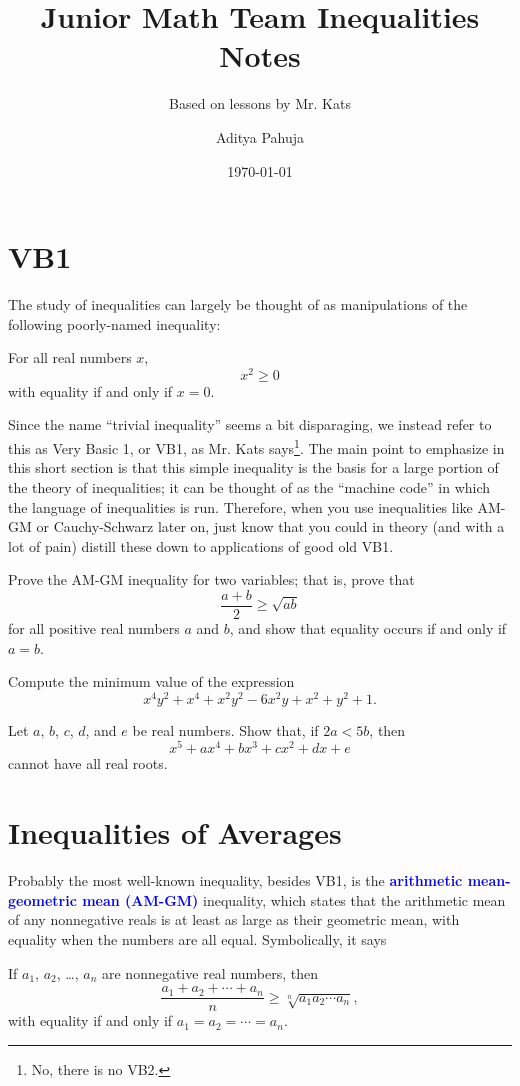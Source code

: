 \documentclass{scrartcl}
\title{Junior Math Team Inequalities Notes}
\subtitle{Based on lessons by Mr. Kats}
\author{Aditya Pahuja}
\date{\today}
\providecommand{\alert}[1]{{\sffamily\textbf{\textcolor{blue}{#1}}}}
\begin{document}
\maketitle
\tableofcontents
\pagebreak

\section{VB1}
The study of inequalities can largely be thought of as manipulations of
the following poorly-named inequality:
\begin{theorem}
	For all real numbers $x$,
	\[x^2 \ge 0\]
	with equality if and only if $x = 0$.
\end{theorem}

Since the name ``trivial inequality'' seems a bit disparaging,
we instead refer to this as Very Basic 1, or VB1, as Mr. Kats
says\footnote{No, there is no VB2.}.
The main point to emphasize in this short section is that
this simple inequality is the basis for a large portion of the
theory of inequalities; it can be thought of as the ``machine code'' in which
the language of inequalities is run.
Therefore, when you use inequalities like AM-GM or Cauchy-Schwarz later on,
just know that you could in theory (and with a lot of pain)
distill these down to applications of good old VB1.

\begin{problem}
	Prove the AM-GM inequality for two variables; that is, prove that
	\[\frac{a + b}{2}\ge \sqrt{ab}\]
	for all positive real numbers $a$ and $b$,
	and show that equality occurs if and only if $a = b$.
\end{problem}

\begin{problem}
	Compute the minimum value of the expression
	\[x^4y^2 + x^4 + x^2y^2 - 6x^2y + x^2 + y^2 + 1.\]
\end{problem}

\begin{problem}
	Let $a$, $b$, $c$, $d$, and $e$ be real numbers. Show that, if
	$2a < 5b$, then
	\[x^5 + ax^4 + bx^3 + cx^2 + dx + e\]
	cannot have all real roots.
\end{problem}

\section{Inequalities of Averages}
Probably the most well-known inequality, besides VB1, is the
\alert{arithmetic mean-geometric mean (AM-GM)} inequality,
which states that the arithmetic mean of any nonnegative reals
is at least as large as their geometric mean, with equality when
the numbers are all equal. Symbolically, it says
\begin{theorem}[AM-GM]
	If $a_1$, $a_2$, \dots, $a_n$ are nonnegative real numbers, then
	\[\frac{a_1 + a_2 + \cdots + a_n}{n} \ge \sqrt[n]{a_1a_2\cdots a_n},\]
	with equality if and only if $a_1 = a_2 = \cdots = a_n$.
\end{theorem}
\end{document}
